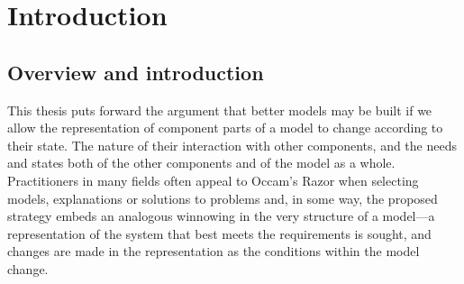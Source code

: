 \titlepg
\signaturepage
\altcopyrightpage
\abswithesis
\ackpage
{}



\chapter[INTRODUCTION]{Introduction}\label{intro}

\section{Overview and introduction}

This thesis puts forward the argument that better models may be built
if we allow the representation of component parts of a model to change
according to their state. The nature of their interaction with other
components, and the needs and states both of the other components and
of the model as a whole. Practitioners in many fields often appeal to
Occam's Razor when selecting models, explanations or solutions to
problems and, in some way, the proposed strategy embeds an analogous
winnowing in the very structure of a model---a representation of the
system that best meets the requirements is sought, and changes are
made in the representation as the conditions within the model change.

